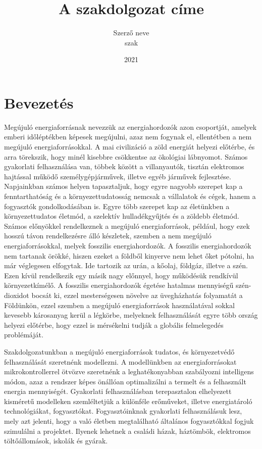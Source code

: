 \documentclass[
]{thesis-ekf}
\theoremstyle{definition}
\theoremstyle{remark}
\begin{document}
\title{A szakdolgozat címe}
\author{Szerző neve\\szak}
\date{2021}
\maketitle
\tableofcontents

\chapter*{Bevezetés}
Megújuló energiaforrásnak nevezzük az energiahordozók azon csoportját, amelyek emberi időléptékben képesek megújulni, azaz nem fogynak el, ellentétben a nem megújuló energiaforrásokkal.  A mai civilizáció a zöld energiát helyezi előtérbe, és arra törekszik, hogy minél kisebbre csökkentse az ökológiai lábnyomot. Számos gyakorlati felhasználása van, többek között a villanyautók, tisztán elektromos hajtással működő személygépjárművek, illetve egyéb járművek fejlesztése. Napjainkban számos helyen tapasztaljuk, hogy egyre nagyobb szerepet kap a fenntarthatóság és a környezettudatosság nemcsak a vállalatok és cégek, hanem a fogyasztók gondolkodásában is. Egyre több szerepet kap az életünkben a környezettudatos életmód, a szelektív hulladékgyűjtés és a zöldebb életmód. Számos előnyökkel rendelkeznek a megújuló energiaforrások, például, hogy ezek hosszú távon rendelkezésre álló készletek, szemben a nem megújuló energiaforrásokkal, melyek fosszilis energiahordozók. A fosszilis energiahordozók nem tartanak örökké, hiszen ezeket a földből kinyerve nem lehet őket pótolni, ha már véglegesen elfogytak. Ide tartozik az urán, a kőolaj, földgáz, illetve a szén. Ezen kívül rendelkezik egy másik nagy előnnyel, hogy működésük rendkívül környezetkímélő. A fosszilis energiahordozók égetése hatalmas mennyiségű szén-dioxidot bocsát ki, ezzel mesterségesen növelve az üvegházhatás folyamatát a Földünkön, ezzel szemben a megújuló energiaforrások használatával sokkal kevesebb károsanyag kerül a légkörbe, melyeknek felhasználását egyre több ország helyezi előtérbe, hogy ezzel is mérsékelni tudják a globális felmelegedés problémáját.
\par Szakdolgozatunkban  a megújuló energiaforrások tudatos, és környezetvédő felhasználását szeretnénk modellezni.  A modellünkben az energiaforrásokat mikrokontrollerrel 
ötvözve szeretnénk a leghatékonyabban szabályozni intelligens módon, azaz a rendszer képes önállóan optimalizálni a termelt és a felhasznált energia mennyiségét. Gyakorlati felhasználásban terepasztalon elhelyezett kisméretű modelleken szemléltetjük a különféle erőműveket, illetve energiatároló technológiákat, fogyasztókat. Fogyasztóinknak gyakorlati felhasználásuk lesz, mely azt jelenti, hogy a való életben megtalálható általános fogyasztókkal fogjuk szimulálni a projektet. Ilyenek lehetnek a családi házak, háztömbök, elektromos töltőállomások, iskolák és gyárak.
\end{document}
